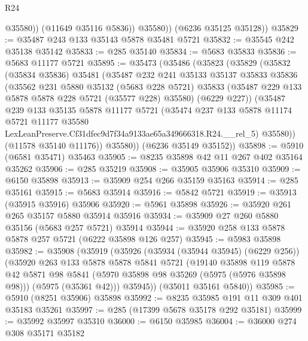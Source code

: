 \begin{lexlean}{R24}
\begin{coremodule}
                @35580))
            (@11649 @35116 @5836))
          @35580))
      (@6236 @35125 @35128))
@35829 := @35487 @243 @133 @35143 @5878 @35481 @5721
@35832 := @35545 @242 @35138 @35142
@35833 := @285 @35140
@35834 := @5683 @35833
@35836 := @5683 @11177 @5721
@35895 := @35473
    (@35486
      (@35823
        (@35829
          (@35832
            (@35834 @35836)
            @35481
            (@35487
              @232
              @241
              @35133
              @35137
              @35833
              @35836
              (@35562
                @231
                @5880
                @35132
                (@5683 @228 @5721)
                @35833
                (@35487 @229 @133 @5878 @5878 @228 @5721 (@35577 @228) @35580)
                (@6229 @227))
              (@35487
                @239
                @133
                @35135
                @5878
                @11177
                @5721
                (@35474
                  @237
                  @133
                  @5878
                  @11174
                  @5721
                  @11177
                  @35580
                  LexLeanPreserve.Cf31dfec9d7f34a9133ae65a349666318.R24.__rel_5)
                @35580))
            (@11578 @35140 @11176))
          @35580))
      (@6236 @35149 @35152))
@35898 := @5910 (@6581 @35471) @35463
@35905 := @8235 @35898 @42 @11 @267 @402 @35164 @35262
@35906 := @285 @35219
@35908 := @35905 @35906 @35310
@35909 := @6150 @35898
@35913 := @35909 @254 @266 @35159 @35163
@35914 := @285 @35161
@35915 := @5683 @35914
@35916 := @5842 @5721
@35919 := @35913 (@35915 @35916) @35906
@35920 := @5961 @35898
@35926 := @35920 @261 @265 @35157 @5880 @35914 @35916
@35934 := @35909 @27 @260 @5880 @35156 (@5683 @257 @5721) @35914
@35944 := @35920 @258 @133 @5878 @5878 @257 @5721 (@6222 @35898 @126 @257)
@35945 := @5983 @35898
@35982 := @35908
    (@35919
      (@35926
        (@35934 (@35944 @35945) (@6229 @256))
        (@35920
          @263
          @133
          @5878
          @5878
          @5841
          @5721
          (@19140
            @35898
            @119
            @5878
            @42
            @5871
            @98
            @5841
            (@5970 @35898 @98 @35269 (@5975 (@5976 @35898 @98)))
            (@5975 (@35361 @42)))
          @35945))
      (@35011 @35161 @5840))
@35985 := @5910 (@8251 @35906) @35898
@35992 := @8235 @35985 @191 @11 @309 @401 @35183 @35261
@35997 := @285 (@17399 @5678 @35178 @292 @35181)
@35999 := @35992 @35997 @35310
@36000 := @6150 @35985
@36004 := @36000 @274 @308 @35171 @35182

\end{coremodule}
\end{lexlean}
